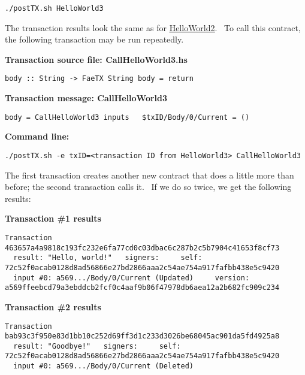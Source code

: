 \documentclass[11pt]{article}
\newcommand{\codeblock}[1]{\begin{mdframed}[
    backgroundcolor=header-color,
    linecolor=header-color,
    innertopmargin=10pt,
    ]{\texttt{#1}}\end{mdframed}}
\DeclareRobustCommand{\fuline}[1]{\texorpdfstring{\uline{#1}}{#1}}
\begin{document}
\codeblock{.\slash{}postTX.sh HelloWorld3}

The transaction results look the same as for \href{https://consensys.quip.com/IHP2AzL922EJ/Tutorial-1-Transactions-and-contracts\%23PfaACAL7oXx}{\fuline{HelloWorld2}}.  To call this contract, the following transaction may be run repeatedly.


\vspace{11pt}

\textbf{Transaction source file: CallHelloWorld3.hs}

\codeblock{body :: String -\textgreater{} FaeTX String\newline
body = return}

\textbf{Transaction message: CallHelloWorld3}

\codeblock{body = CallHelloWorld3\newline
inputs\newline
  \$txID\slash{}Body\slash{}0\slash{}Current = ()}

\textbf{Command line:}

\codeblock{.\slash{}postTX.sh -e txID=\textless{}transaction ID from HelloWorld3\textgreater{} CallHelloWorld3}

The first transaction creates another new contract that does a little more than before; the second transaction calls it.  If we do so twice, we get the following results:\newline


\textbf{Transaction \#1 results}

\codeblock{Transaction 463657a4a9818c193fc232e6fa77cd0c03dbac6c287b2c5b7904c41653f8cf73\newline
  result: "Hello, world!"\newline
  signers:\newline
    self: 72c52f0acab0128d8ad56866e27bd2866aaa2c54ae754a917fafbb438e5c9420\newline
  input \#0: a569...\slash{}Body\slash{}0\slash{}Current (Updated)\newline
    version: a569ffeebcd79a3ebddcb2fcf0c4aaf9b06f47978db6aea12a2b682fc909c234}

\textbf{Transaction \#2 results}

\codeblock{Transaction bab93c3f950e83d1bb10c252d69ff3d1c233d3026be68045ac901da5fd4925a8\newline
  result: "Goodbye!"\newline
  signers:\newline
    self: 72c52f0acab0128d8ad56866e27bd2866aaa2c54ae754a917fafbb438e5c9420\newline
  input \#0: a569...\slash{}Body\slash{}0\slash{}Current (Deleted)}
\end{document}
